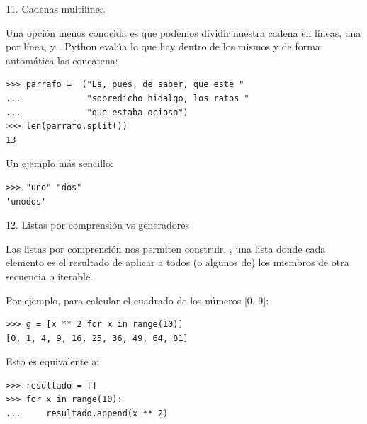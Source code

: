 \documentclass[14pt]{beamer}
\begin{document}
\begin{frame}[fragile]{11. Cadenas multilínea}

  \begin{alertblock}{}
    \small
    \centering
    Una opción menos conocida es que podemos dividir nuestra cadena en
    líneas, una por línea, y .
    Python evalúa lo que hay dentro de los mismos y de forma
    automática las concatena:
   \end{alertblock}

  \begin{exampleblock}{}
    \scriptsize
    \begin{lstlisting}
>>> parrafo =  ("Es, pues, de saber, que este "
...             "sobredicho hidalgo, los ratos "
...             "que estaba ocioso")
>>> len(parrafo.split())
13
    \end{lstlisting}
  \end{exampleblock}

  \small
  \begin{exampleblock}
    {Un ejemplo más sencillo:}
    \begin{lstlisting}
>>> "uno" "dos"
'unodos'
    \end{lstlisting}
  \end{exampleblock}
\end{frame}

\begin{frame}[fragile]
  {\large 12. Listas por comprensión vs generadores}
  \begin{block}{}
    \small
    \centering
    Las listas por comprensión nos permiten construir, , una lista donde cada elemento es el resultado de
    aplicar  a todos (o algunos de) los
    miembros de otra secuencia o iterable.
  \end{block}

  \footnotesize
  \begin{exampleblock}
    {Por ejemplo, para calcular el cuadrado de los números [0, 9]:}
    \begin{lstlisting}
>>> g = [x ** 2 for x in range(10)]
[0, 1, 4, 9, 16, 25, 36, 49, 64, 81]
    \end{lstlisting}
  \end{exampleblock}

  \begin{exampleblock}
    {Esto es equivalente a:}
    \begin{lstlisting}
>>> resultado = []
>>> for x in range(10):
...     resultado.append(x ** 2)
    \end{lstlisting}
  \end{exampleblock}
\end{frame}
\end{document}
